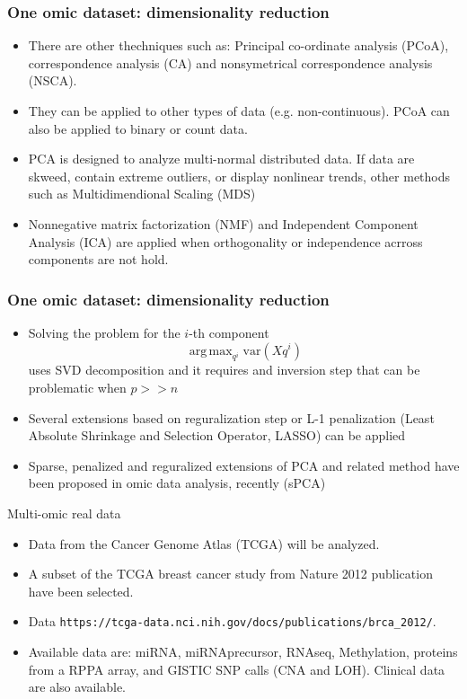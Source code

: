 \documentclass[10pt,xcolor=dvipsnames]{beamer}\usepackage[]{graphicx}\usepackage[]{color}
\DeclareMathOperator{\argmax}{arg\,max}
\begin{document}
\begin{frame}[fragile]\frametitle{One omic dataset: dimensionality reduction}

\begin{itemize}
\item There are other thechniques such as: Principal co-ordinate analysis (PCoA), correspondence analysis (CA) and nonsymetrical correspondence analysis (NSCA).
\pause
\item They can be applied to other types of data (e.g. non-continuous). PCoA can also be applied to binary or count data.
\pause
\item PCA is designed to analyze multi-normal distributed data. If data are skweed, contain extreme outliers, or display nonlinear trends, other methods such as 
Multidimendional Scaling (MDS)
\pause
\item Nonnegative matrix factorization (NMF) and Independent Component Analysis (ICA) are applied when orthogonality or independence acrross components are not hold.
\end{itemize}

\end{frame}


\begin{frame}[fragile]\frametitle{One omic dataset: dimensionality reduction}

 \begin{itemize}
 \item Solving the problem for the $i$-th component $$ \argmax_{q^i} \text{var}(Xq^i)$$ uses SVD decomposition and it requires and inversion step that can be problematic when   $p >> n$
 \item Several extensions based on reguralization step or L-1 penalization (Least Absolute Shrinkage and Selection Operator, LASSO) can be applied
 \item Sparse, penalized and reguralized extensions of PCA and related method have been proposed in omic data analysis, recently (sPCA)
 \end{itemize}
\end{frame}



\begin{frame}{Multi-omic real data}

\begin{itemize}
  \item Data from the Cancer Genome Atlas (TCGA) will be analyzed.
  \item A subset of the TCGA breast cancer study from Nature 2012 publication have been selected.
  \item Data {\tt https://tcga-data.nci.nih.gov/docs/publications/brca\_2012/}.
  \item Available data are: miRNA, miRNAprecursor, RNAseq, Methylation, proteins from a RPPA array, and  GISTIC SNP calls (CNA and LOH). Clinical data are also available.
 \end{itemize}

\end{frame}
\end{document}
